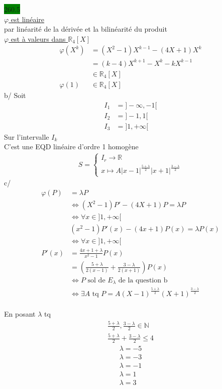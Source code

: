 \documentclass{article}
\begin{document}
\noindent \colorbox{green}{260.5}\\
\underline{\(\varphi\) est linéaire} \\
par linéarité de la dérivée et la bilinéarité du produit \\
\underline{\(\varphi\) est à valeurs dans \(\mathbb{R}_4[X]\)}\\
\begin{align*}
    \varphi(X^k) &= (X^2 -1)X^{k-1} - (4X+1)X^k\\
    &= (k-4)X^{k+1} - X^k - kX^{k-1}\\
    &\in \mathbb{R}_4[X]\\
    \varphi(1) &\in \mathbb{R}_4[X]
\end{align*}
b/ Soit \begin{align*}
    I_1 &= ]-\infty, -1[\\
    I_2 &= ]-1, 1[\\
    I_3 &= ] 1, +\infty[
\end{align*}
Sur l'intervalle \(I_k\)\\
C'est une EQD linéaire d'ordre 1 homogène \\
\begin{align*}
    S = \begin{cases}
        I_r \to \mathbb{R}\\
        x \mapsto A|x-1|^{\frac{5+\lambda}{2}}|x+1|^{\frac{3-\lambda}{2}}
    \end{cases}
\end{align*}
c/ \begin{align*}
    \varphi(P) &= \lambda P\\
    &\Leftrightarrow (X^2 -1)P'-(4X+1)P = \lambda P \\
    &\Leftrightarrow \forall x \in ]1, +\infty[\\
    &(x^2-1)P'(x) - (4x+1)P(x) = \lambda P(x)\\
    &\Leftrightarrow \forall x \in ]1, +\infty[ \\
    P'(x) &= \frac{4x+1+\lambda}{x^2-1}P(x)\\
    &= (\frac{5+\lambda}{2(x-1)} + \frac{3-\lambda}{2(x+1)}) P(x)\\
    &\Leftrightarrow P \text{ sol de } E_\lambda \text{ de la question b }\\
    &\Leftrightarrow \exists A \text{ tq } P = A(X-1)^{\frac{5+\lambda}{2}}(X+1)^{\frac{3-\lambda}{2}}
\end{align*}\\
En posant \(\lambda\) tq \begin{align*}
    \frac{5+\lambda}{2}, \frac{3-\lambda}{2} \in \mathbb{N}\\
    \frac{5+\lambda}{2} + \frac{3-\lambda}{2} \leq 4
\end{align*}
\begin{align*}
    \lambda = -5 \\
    \lambda = -3 \\
    \lambda = -1 \\
    \lambda = 1 \\
    \lambda = 3 
\end{align*}
\end{document}
